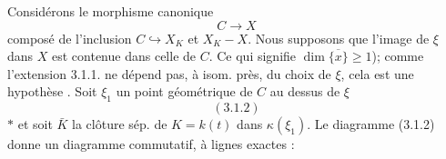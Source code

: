 Considérons  le morphisme canonique
\[C\longrightarrow X\]
composé de l'inclusion $C\hookrightarrow X_K$ et $X_K-X$.
Nous supposons que  l'image de $\xi$ dans $X$ est contenue dans celle de $C$. Ce qui signifie $\dim\overline{\{x\}}\geq1$);  comme l'extension 3.1.1. ne dépend pas, à isom. près, du choix de $\xi$, cela est une hypothèse . Soit $\xi_1$ un point géométrique de $C$ au dessus de $\xi$
\[(3.1.2)\]
 $*$
et soit $\bar K$ la clôture sép. de $K=k(t)$ dans $\kappa(\xi_1)$.
Le diagramme (3.1.2) donne un diagramme commutatif, à lignes exactes :
